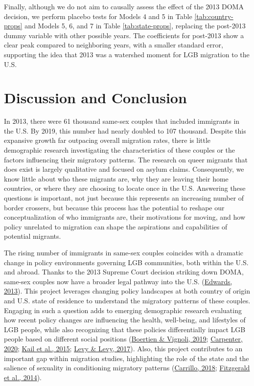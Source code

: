 \documentclass[
  11pt,
]{article}
\begin{document}
Finally, although we do not aim to causally assess the effect of the 2013 DOMA decision, we perform placebo tests for Models 4 and 5 in Table \ref{tab:country-props} and Models 5, 6, and 7 in Table \ref{tab:state-props}, replacing the post-2013 dummy variable with other possible years. The coefficients for post-2013 show a clear peak compared to neighboring years, with a smaller standard error, supporting the idea that 2013 was a watershed moment for LGB migration to the U.S.

\hypertarget{discussion-and-conclusion}{%
\section{Discussion and Conclusion}\label{discussion-and-conclusion}}

In 2013, there were 61 thousand same-sex couples that included immigrants in the U.S. By 2019, this number had nearly doubled to 107 thousand. Despite this expansive growth far outpacing overall migration rates, there is little demographic research investigating the characteristics of these couples or the factors influencing their migratory patterns. The research on queer migrants that does exist is largely qualitative and focused on asylum claims. Consequently, we know little about who these migrants are, why they are leaving their home countries, or where they are choosing to locate once in the U.S. Answering these questions is important, not just because this represents an increasing number of border crossers, but because this process has the potential to reshape our conceptualization of who immigrants are, their motivations for moving, and how policy unrelated to migration can shape the aspirations and capabilities of potential migrants.

The rising number of immigrants in same-sex couples coincides with a dramatic change in policy environments governing LGB communities, both within the U.S. and abroad. Thanks to the 2013 Supreme Court decision striking down DOMA, same-sex couples now have a broader legal pathway into the U.S. (\protect\hyperlink{ref-edwards_2013}{Edwards, 2013}). This project leverages changing policy landscapes at both country of origin and U.S. state of residence to understand the migratory patterns of these couples. Engaging in such a question adds to emerging demographic research evaluating how recent policy changes are influencing the health, well-being, and lifestyles of LGB people, while also recognizing that these policies differentially impact LGB people based on different social positions (\protect\hyperlink{ref-boertien_2019}{Boertien \& Vignoli, 2019}; \protect\hyperlink{ref-carpenter_2020}{Carpenter, 2020}; \protect\hyperlink{ref-kail_2015}{Kail et al., 2015}; \protect\hyperlink{ref-levy_2017}{Levy \& Levy, 2017}). Also, this project contributes to an important gap within migration studies, highlighting the role of the state and the salience of sexuality in conditioning migratory patterns (\protect\hyperlink{ref-carrillo_2018}{Carrillo, 2018}; \protect\hyperlink{ref-fitzgerald_2014}{Fitzgerald et al., 2014}).
\end{document}
